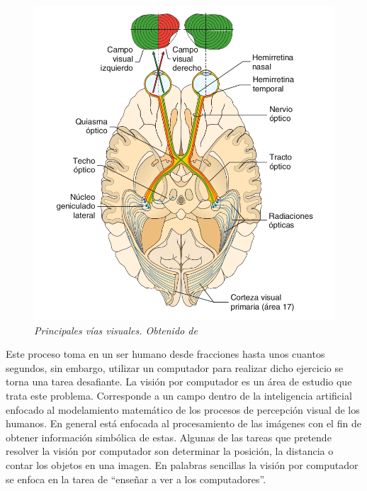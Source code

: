 \begin{figure}[h]
  \centering
  \includegraphics[scale=.3]{images/cerebro}
  \caption{\em Principales vías visuales. Obtenido de \cite{Battaglini2010}}  
  \label{fig:cerebro}
\end{figure}

Este proceso toma en un ser humano desde fracciones hasta unos cuantos segundos, sin embargo, utilizar un computador para realizar dicho ejercicio se torna una tarea desafiante. La visión por computador es un área de estudio que trata este problema. Corresponde a un campo dentro de la inteligencia artificial enfocado al modelamiento matemático de los procesos de percepción visual de los humanos. En general está enfocada al procesamiento de las imágenes con el fin de obtener información simbólica de estas. Algunas de las tareas que pretende resolver la visión por computador son determinar la posición, la distancia o contar los objetos en una imagen. En palabras sencillas la visión por computador se enfoca en la tarea de ``enseñar a ver a los computadores''.

